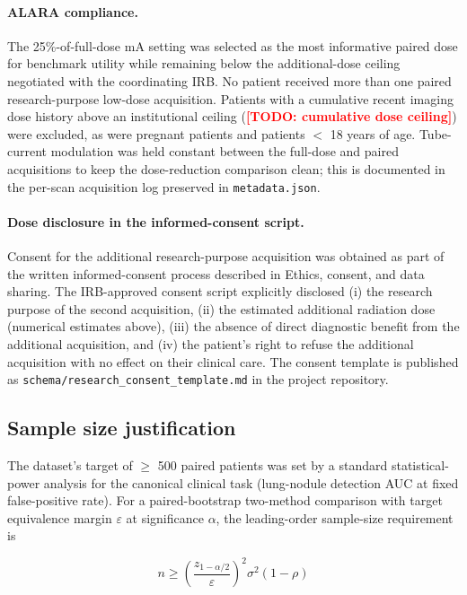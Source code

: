 \documentclass[twoside,11pt]{article}
\newcommand{\todo}[1]{\textcolor{red}{\textbf{[TODO: #1]}}}
\begin{document}
\paragraph{ALARA compliance.} The 25\%-of-full-dose mA setting was selected as the most informative paired dose for benchmark utility while remaining below the additional-dose ceiling negotiated with the coordinating IRB. No patient received more than one paired research-purpose low-dose acquisition. Patients with a cumulative recent imaging dose history above an institutional ceiling (\todo{cumulative dose ceiling}) were excluded, as were pregnant patients and patients $<$ 18 years of age. Tube-current modulation was held constant between the full-dose and paired acquisitions to keep the dose-reduction comparison clean; this is documented in the per-scan acquisition log preserved in \texttt{metadata.json}.

\paragraph{Dose disclosure in the informed-consent script.} Consent for the additional research-purpose acquisition was obtained as part of the written informed-consent process described in Ethics, consent, and data sharing. The IRB-approved consent script explicitly disclosed (i) the research purpose of the second acquisition, (ii) the estimated additional radiation dose (numerical estimates above), (iii) the absence of direct diagnostic benefit from the additional acquisition, and (iv) the patient's right to refuse the additional acquisition with no effect on their clinical care. The consent template is published as \texttt{schema/research\_consent\_template.md} in the project repository.

\subsection*{Sample size justification}

The dataset's target of $\geq$ 500 paired patients was set by a standard statistical-power analysis for the canonical clinical task (lung-nodule detection AUC at fixed false-positive rate). For a paired-bootstrap two-method comparison with target equivalence margin $\varepsilon$ at significance $\alpha$, the leading-order sample-size requirement is

\begin{equation}
    n \geq \left(\frac{z_{1-\alpha/2}}{\varepsilon}\right)^2 \sigma^2 (1 - \rho)
\end{equation}
\end{document}
